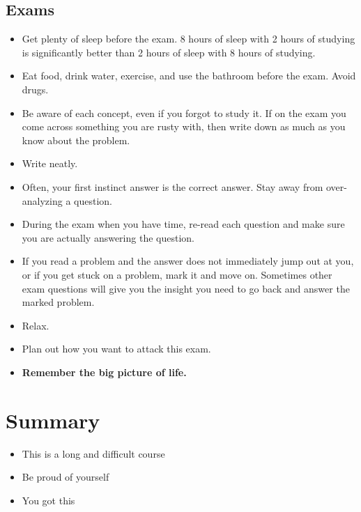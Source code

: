 \documentclass[main.tex]{subfiles}
\begin{document}
\subsection{Exams}

\begin{itemize} %
	\item Get plenty of sleep before the exam. 8 hours of sleep with 2 hours of studying is significantly better than 2 hours of sleep with 8 hours of studying.
	\item Eat food, drink water, exercise, and use the bathroom before the exam. Avoid drugs.
	\item Be aware of each concept, even if you forgot to study it. If on the exam you come across something you are rusty with, then write down as much as you know about the problem.
	\item Write neatly.
	\item Often, your first instinct answer is the correct answer. Stay away from over-analyzing a question.
	\item During the exam when you have time, re-read each question and make sure you are actually answering the question.
	\item If you read a problem and the answer does not immediately jump out at you, or if you get stuck on a problem, mark it and move on. Sometimes other exam questions will give you the insight you need to go back and answer the marked problem.
	\item Relax.
	\item Plan out how you want to attack this exam. %
	\item \textbf{Remember the big picture of life.}
\end{itemize}

\section{Summary}

\begin{itemize}
	\item This is a long and difficult course
	\item Be proud of yourself
	\item You got this
\end{itemize}
\end{document}
